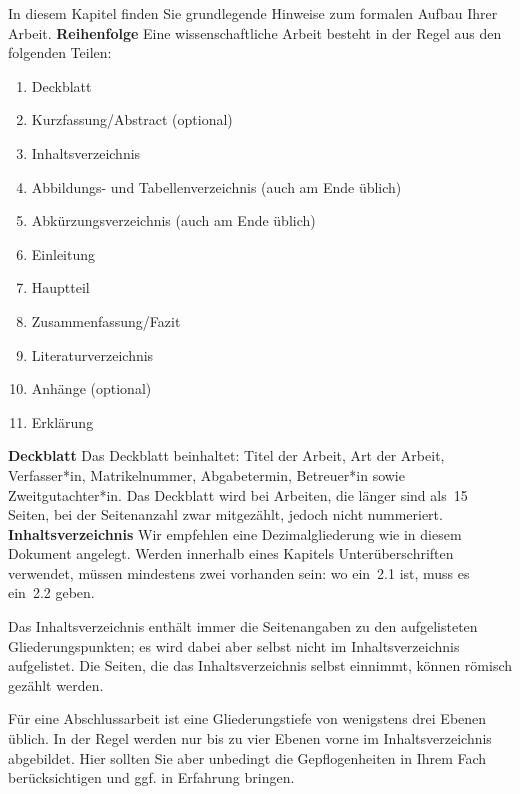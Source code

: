 \label{chap:formal}
%
In diesem Kapitel finden Sie grundlegende Hinweise zum formalen Aufbau Ihrer Arbeit.
%
\textbf{Reihenfolge}
\label{sec:aufbau}
Eine wissenschaftliche Arbeit besteht in der Regel aus den folgenden Teilen:
%
\begin{enumerate}
 \item Deckblatt
 \item Kurzfassung/Abstract (optional)
 \item Inhaltsverzeichnis
 \item Abbildungs- und Tabellenverzeichnis (auch am Ende üblich)
 \item Abkürzungsverzeichnis (auch am Ende üblich)
 \item Einleitung
 \item Hauptteil
 \item Zusammenfassung/Fazit
 \item Literaturverzeichnis
 \item Anhänge (optional)
 \item Erklärung
\end{enumerate}
%
%
\textbf{Deckblatt}
Das Deckblatt beinhaltet: Titel der Arbeit, Art der Arbeit, Verfasser*in, Matrikelnummer, Abgabetermin, Betreuer*in sowie Zweitgutachter*in. Das Deckblatt wird bei Arbeiten, die länger sind als~15 Seiten, bei der Seitenanzahl zwar mitgezählt, jedoch nicht nummeriert.
%
%
\textbf{Inhaltsverzeichnis}
\label{sec:listOfContents}
Wir empfehlen eine Dezimalgliederung wie in diesem Dokument angelegt. Werden innerhalb eines Kapitels Unterüberschriften verwendet, müssen mindestens zwei vorhanden sein: wo ein~2.1 ist, muss es ein~2.2 geben.
\par
Das Inhaltsverzeichnis enthält immer die Seitenangaben zu den aufgelisteten Gliederungspunkten; es wird dabei aber selbst nicht im Inhaltsverzeichnis aufgelistet. Die Seiten, die das Inhaltsverzeichnis selbst einnimmt, können römisch gezählt werden.
\par
Für eine Abschlussarbeit ist eine Gliederungstiefe von wenigstens drei Ebenen üblich. In der Regel werden nur bis zu vier Ebenen vorne im Inhaltsverzeichnis abgebildet. Hier sollten Sie aber unbedingt die Gepflogenheiten in Ihrem Fach berücksichtigen und ggf. in Erfahrung bringen.

